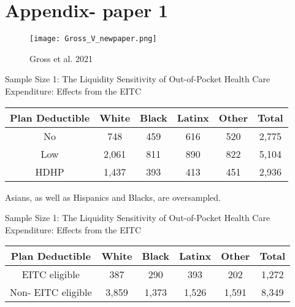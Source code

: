 \documentclass[t, hyperref={colorlinks=true}, compress]{beamer}
\begin{document}
\section{Appendix- paper 1}

\begin{frame}
\begin{figure}

\texttt{[image: Gross\_V\_newpaper.png]}
    \caption{Gross et al. 2021}
\end{figure}

\end{frame}

\begin{frame}{Sample Size 1: The Liquidity Sensitivity of Out-of-Pocket Health Care Expenditure: Effects from the EITC} 
\begin{table}
\begin{tabular}{| cccccc |}\label{STATE_EITC}
\textbf{Plan Deductible} & \textbf{White} & \textbf{Black}&	\textbf{Latinx}&	\textbf{Other} & \textbf{Total} \\
\hline
No	& 748 &	 459& 616 & 520 & 2,775 \\
Low &	 2,061 &  811  & 890 &  822  & 5,104 \\
HDHP	&1,437	&	393	&	  413& 451& 2,936	\\
\hline
\end{tabular}
Asians, as well as Hispanics and Blacks, are oversampled.
\end{table}
\end{frame}


\begin{frame}{Sample Size 1: The Liquidity Sensitivity of Out-of-Pocket Health Care Expenditure: Effects from the EITC} 
\begin{table}
\begin{tabular}{| cccccc |}
\textbf{Plan Deductible} & \textbf{White} & \textbf{Black}&	\textbf{Latinx}&	\textbf{Other} & \textbf{Total} \\
\hline
EITC eligible	& 387 & 290 & 393 & 202 & 1,272  \\
Non- EITC eligible &	 3,859 &  1,373  & 1,526 &   1,591  & 8,349 \\
\hline
\end{tabular}
\end{table}
\end{frame}
\end{document}
